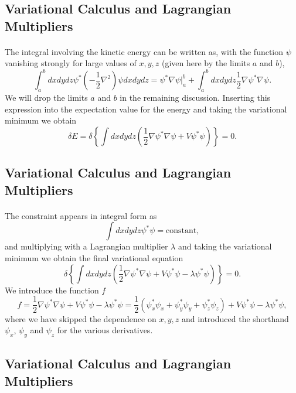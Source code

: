 \documentclass[%
twoside,                 %
final,                   %
10pt]{article}
\begin{document}
\subsection{Variational Calculus and Lagrangian Multipliers}

\paragraph{}
The integral involving the kinetic energy can be written as, with the function $\psi$ vanishing
strongly for large values of $x,y,z$ (given here by the limits $a$ and $b$), 
 \[
  \int_a^b dxdydz \psi^* \left(-\frac{1}{2}\nabla^2\right) \psi dxdydz = \psi^*\nabla\psi|_a^b+\int_a^b dxdydz\frac{1}{2}\nabla\psi^*\nabla\psi.
\]
We will drop the limits $a$ and $b$ in the remaining discussion. 
Inserting this expression into the expectation value for the energy and taking the variational minimum  we obtain
\[
\delta E = \delta \left\{\int dxdydz\left( \frac{1}{2}\nabla\psi^*\nabla\psi+V\psi^*\psi\right)\right\} = 0.
\]



\subsection{Variational Calculus and Lagrangian Multipliers}

\paragraph{}
The constraint appears in integral form as 
\[
 \int dxdydz \psi^* \psi=\mathrm{constant},
\]
and multiplying with a Lagrangian multiplier $\lambda$ and taking the variational minimum we obtain the final variational equation
\[
\delta \left\{\int dxdydz\left( \frac{1}{2}\nabla\psi^*\nabla\psi+V\psi^*\psi-\lambda\psi^*\psi\right)\right\} = 0.
\]
We introduce the function  $f$
\[
  f =  \frac{1}{2}\nabla\psi^*\nabla\psi+V\psi^*\psi-\lambda\psi^*\psi=
\frac{1}{2}(\psi^*_x\psi_x+\psi^*_y\psi_y+\psi^*_z\psi_z)+V\psi^*\psi-\lambda\psi^*\psi,
\]
where we have skipped the dependence on $x,y,z$ and introduced the shorthand $\psi_x$, $\psi_y$ and $\psi_z$  for the various derivatives.



\subsection{Variational Calculus and Lagrangian Multipliers}
\end{document}
